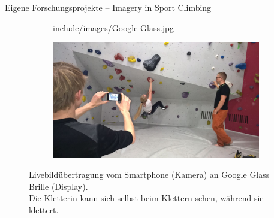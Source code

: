 \begin{frame}{Eigene Forschungsprojekte -- Imagery in Sport Climbing}
\begin{figure}[h]
	\centering
	\begin{subfigure}[t]{0.49\columnwidth}
		\centering
		\begin{overpic}[width=\textwidth]{include/images/Google-Glass.jpg}
		\end{overpic}
		\label{fig:google-glass}
	\end{subfigure}
	\hspace*{\fill}
	\begin{subfigure}[t]{0.49\columnwidth}
		\centering
		\includegraphics[width=\textwidth]{include/images/Live-Video.jpg}
		\label{fig:live-video-action}
	\end{subfigure}
	\caption{Livebildübertragung vom Smartphone (Kamera) an Google Glass Brille (Display). \\Die Kletterin kann sich selbst beim Klettern sehen, während sie klettert.}
	\label{fig:live-video}
\end{figure}
\end{frame}

